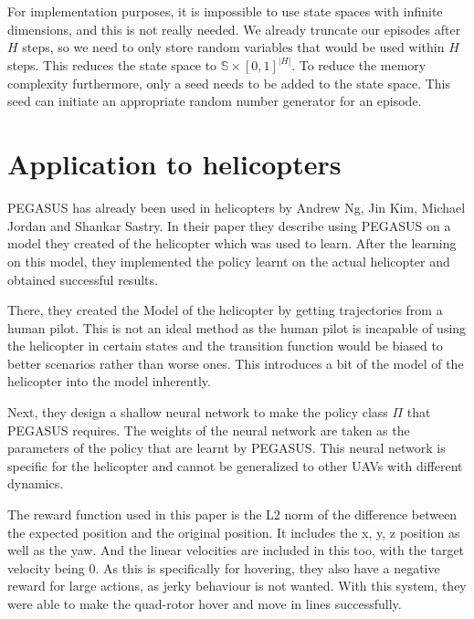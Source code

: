 \documentclass[BTech]{iitmdiss}
\begin{document}
For implementation purposes, it is impossible to use state spaces with infinite dimensions, and this is not really needed. We already truncate our episodes after $H$ steps, so we need to only store random variables that would be used within $H$ steps. This reduces the state space to $\mathbb{S} \times [0,1]^{|H|}$. To reduce the memory complexity furthermore, only a seed needs to be added to the state space. This seed can initiate an appropriate random number generator for an episode.

\section{Application to helicopters}

PEGASUS has already been used in helicopters \cite{HelicopterPegasus}  by Andrew Ng, Jin Kim, Michael Jordan and Shankar Sastry. In their paper they describe using PEGASUS on a model they created of the helicopter which was used to learn. After the learning on this model, they implemented the policy learnt on the actual helicopter and obtained successful results.

There, they created the Model of the helicopter by getting trajectories from a human pilot. This is not an ideal method as the human pilot is incapable of using the helicopter in certain states and the transition function would be biased to better scenarios rather than worse ones. This introduces a bit of the model of the helicopter into the model inherently.

Next, they design a shallow neural network to make the policy class $\Pi$ that PEGASUS requires. The weights of the neural network are taken as the parameters of the policy that are learnt by PEGASUS. This neural network is specific for the helicopter and cannot be generalized to other UAVs with different dynamics.

The reward function used in this paper is the L2 norm of the difference between the expected position and the original position. It includes the x, y, z position as well as the yaw. And the linear velocities are included in this too, with the target velocity being 0. As this is specifically for hovering, they also have a negative reward for large actions, as jerky behaviour is not wanted. With this system, they were able to make the quad-rotor hover and move in lines successfully.
\end{document}
